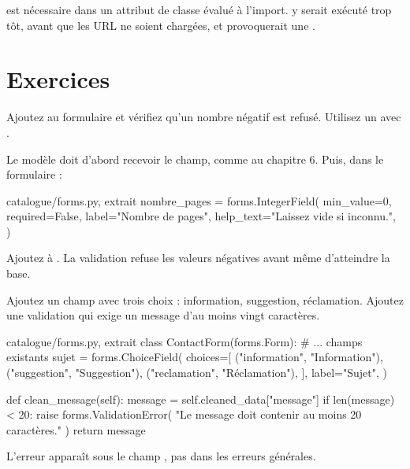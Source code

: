 \begin{piege}
 est nécessaire dans un attribut de classe évalué à l'import.
 y serait exécuté trop tôt, avant que les URL ne soient chargées, et
provoquerait une .
\end{piege}

\section{Exercices}

\begin{exercice}
Ajoutez  au formulaire  et vérifiez qu'un
nombre négatif est refusé. Utilisez un  avec
.
\end{exercice}

\begin{correction}
Le modèle doit d'abord recevoir le champ, comme au chapitre 6. Puis, dans le
formulaire :

\begin{codebox}[python]{catalogue/forms.py, extrait}
nombre_pages = forms.IntegerField(
    min_value=0,
    required=False,
    label="Nombre de pages",
    help_text="Laissez vide si inconnu.",
)
\end{codebox}

Ajoutez  à . La validation refuse les valeurs
négatives avant même d'atteindre la base.
\end{correction}

\begin{exercice}
Ajoutez un champ  avec trois choix : information, suggestion,
réclamation. Ajoutez une validation qui exige un message d'au moins vingt
caractères.
\end{exercice}

\begin{correction}
\begin{codebox}[python]{catalogue/forms.py, extrait}
class ContactForm(forms.Form):
    # ... champs existants
    sujet = forms.ChoiceField(
        choices=[
            ("information", "Information"),
            ("suggestion", "Suggestion"),
            ("reclamation", "Réclamation"),
        ],
        label="Sujet",
    )

    def clean_message(self):
        message = self.cleaned_data["message"]
        if len(message) < 20:
            raise forms.ValidationError(
                "Le message doit contenir au moins 20 caractères."
            )
        return message
\end{codebox}

L'erreur apparaît sous le champ , pas dans les erreurs générales.
\end{correction}

